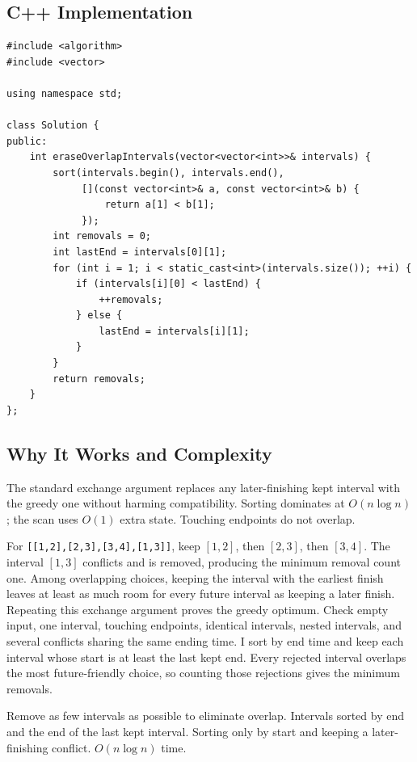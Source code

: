 \subsection{C++ Implementation}
\begin{lstlisting}[style=compactcode,caption={Complete C++ solution: Non-overlapping Intervals}]
#include <algorithm>
#include <vector>

using namespace std;

class Solution {
public:
    int eraseOverlapIntervals(vector<vector<int>>& intervals) {
        sort(intervals.begin(), intervals.end(),
             [](const vector<int>& a, const vector<int>& b) {
                 return a[1] < b[1];
             });
        int removals = 0;
        int lastEnd = intervals[0][1];
        for (int i = 1; i < static_cast<int>(intervals.size()); ++i) {
            if (intervals[i][0] < lastEnd) {
                ++removals;
            } else {
                lastEnd = intervals[i][1];
            }
        }
        return removals;
    }
};
\end{lstlisting}

\subsection{Why It Works and Complexity}
The standard exchange argument replaces any later-finishing kept interval with
the greedy one without harming compatibility. Sorting dominates at
\(O(n\log n)\); the scan uses \(O(1)\) extra state. Touching endpoints do
not overlap.

\lessonexpansion
  {For \texttt{[[1,2],[2,3],[3,4],[1,3]]}, keep \([1,2]\), then \([2,3]\),
   then \([3,4]\). The interval \([1,3]\) conflicts and is removed, producing
   the minimum removal count one.}
  {Among overlapping choices, keeping the interval with the earliest finish
   leaves at least as much room for every future interval as keeping a later
   finish. Repeating this exchange argument proves the greedy optimum.}
  {Check empty input, one interval, touching endpoints, identical intervals,
   nested intervals, and several conflicts sharing the same ending time.}
  {I sort by end time and keep each interval whose start is at least the last
   kept end. Every rejected interval overlaps the most future-friendly choice,
   so counting those rejections gives the minimum removals.}

\chaptercheckpoint
  {Remove as few intervals as possible to eliminate overlap.}
  {Intervals sorted by end and the end of the last kept interval.}
  {Sorting only by start and keeping a later-finishing conflict.}
  {$O(n\log n)$ time.}


